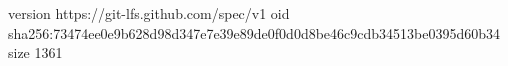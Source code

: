 version https://git-lfs.github.com/spec/v1
oid sha256:73474ee0e9b628d98d347e7e39e89de0f0d0d8be46c9cdb34513be0395d60b34
size 1361
